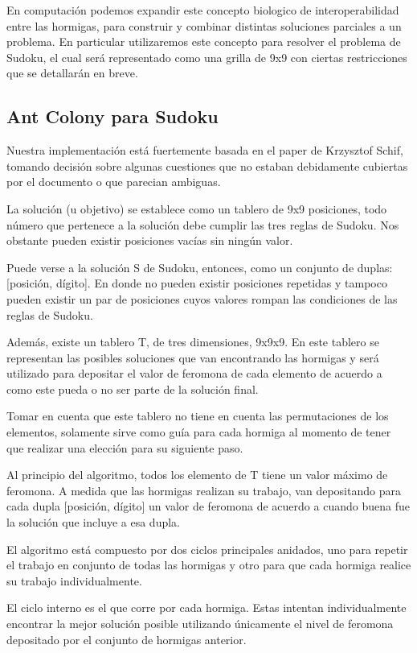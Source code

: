 \documentclass[a4paper,spanish]{article}
\begin{document}
En computación podemos expandir este concepto biologico de interoperabilidad entre las hormigas, para construir
y combinar distintas soluciones parciales a un problema. En particular utilizaremos este concepto para
resolver el problema de Sudoku, el cual será representado como una grilla de 9x9 con ciertas restricciones que se
detallarán en breve.

\subsection{Ant Colony para Sudoku}

Nuestra implementación está fuertemente basada en el paper de Krzysztof Schif, tomando decisión sobre algunas
cuestiones que no estaban debidamente cubiertas por el documento o que parecian ambiguas.

La solución (u objetivo) se establece como un tablero de 9x9 posiciones, todo número que pertenece a la 
solución debe cumplir las tres reglas de Sudoku. Nos obstante pueden existir posiciones vacías sin ningún valor.

Puede verse a la solución S de Sudoku, entonces, como un conjunto de duplas: [posición, dígito]. En donde no pueden
existir posiciones repetidas y tampoco pueden existir un par de posiciones cuyos valores rompan las condiciones de 
las reglas de Sudoku.

Además, existe un tablero T, de tres dimensiones, 9x9x9. En este tablero se representan las posibles soluciones
que van encontrando las hormigas y será utilizado para depositar el valor de feromona de cada elemento de acuerdo
a como este pueda o no ser parte de la solución final.

Tomar en cuenta que este tablero no tiene en cuenta las permutaciones de los elementos, solamente sirve como guía 
para cada hormiga al momento de tener que realizar una elección para su siguiente paso.

Al principio del algoritmo, todos los elemento de T tiene un valor máximo de feromona. A medida que las hormigas
realizan su trabajo, van depositando para cada dupla [posición, dígito] un valor de feromona de acuerdo a cuando buena fue
la solución que incluye a esa dupla.

El algoritmo está compuesto por dos ciclos principales anidados, uno para repetir el trabajo en conjunto 
de todas las hormigas y otro para que cada hormiga realice su trabajo individualmente.

El ciclo interno es el que corre por cada hormiga. Estas intentan individualmente encontrar 
la mejor solución posible utilizando únicamente el nivel de feromona depositado por el conjunto de hormigas anterior. 
\end{document}
